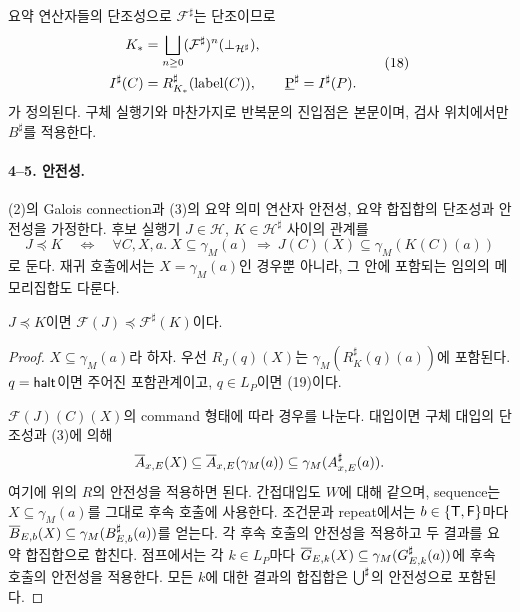 \documentclass[a4paper,10pt]{article}
\begin{document}
요약 연산자들의 단조성으로 $\mathcal F^\sharp$는 단조이므로
\[
 \begin{aligned}
 K_*&=\bigsqcup_{n\ge0}(\mathcal F^\sharp)^n(\bot_{\mathcal H^\sharp}),\\
 I^\sharp(C)&=R^\sharp_{K_*}(\operatorname{label}(C)),\qquad
 \underbar{P}^\sharp=I^\sharp(P).
 \end{aligned}                                                     \tag{18}
\]
가 정의된다. 구체 실행기와 마찬가지로 반복문의 진입점은 본문이며,
검사 위치에서만 $B^\sharp$를 적용한다.

\paragraph{4--5. 안전성.}
(2)의 Galois connection과 (3)의 요약 의미 연산자 안전성,
요약 합집합의 단조성과 안전성을 가정한다.
후보 실행기 $J\in\mathcal H$, $K\in\mathcal H^\sharp$ 사이의 관계를
\[
 J\preceq K\quad\Longleftrightarrow\quad
 \forall C,X,a.\ X\subseteq\gamma_M(a)
 \ \Longrightarrow\ J(C)(X)\subseteq\gamma_M(K(C)(a))            \tag{19}
\]
로 둔다. 재귀 호출에서는 $X=\gamma_M(a)$인 경우뿐 아니라,
그 안에 포함되는 임의의 메모리집합도 다룬다.


\begin{lemma}
$J\preceq K$이면 $\mathcal F(J)\preceq\mathcal F^\sharp(K)$이다.
\end{lemma}
\begin{proof}
$X\subseteq\gamma_M(a)$라 하자. 우선 $R_J(q)(X)$는
$\gamma_M(R^\sharp_K(q)(a))$에 포함된다.
$q=\mathsf{halt}$이면 주어진 포함관계이고, $q\in L_P$이면 (19)이다.

$\mathcal F(J)(C)(X)$의 command 형태에 따라 경우를 나눈다.
대입이면 구체 대입의 단조성과 (3)에 의해
\[
 \overline{A}_{x,E}(X)
 \subseteq\overline{A}_{x,E}(\gamma_M(a))
 \subseteq\gamma_M(A^\sharp_{x,E}(a)).
\]
여기에 위의 $R$의 안전성을 적용하면 된다.
간접대입도 $W$에 대해 같으며, sequence는 $X\subseteq\gamma_M(a)$를
그대로 후속 호출에 사용한다.
조건문과 repeat에서는 $b\in\{\mathsf T,\mathsf F\}$마다
$\overline{B}_{E,b}(X)\subseteq\gamma_M(B^\sharp_{E,b}(a))$를 얻는다.
각 후속 호출의 안전성을 적용하고 두 결과를 요약 합집합으로 합친다.
점프에서는 각 $k\in L_P$마다
$\overline{G}_{E,k}(X)\subseteq\gamma_M(G^\sharp_{E,k}(a))$에
후속 호출의 안전성을 적용한다.
모든 $k$에 대한 결과의 합집합은 $\bigcup\nolimits^\sharp$의 안전성으로 포함된다.
\end{proof}
\end{document}
